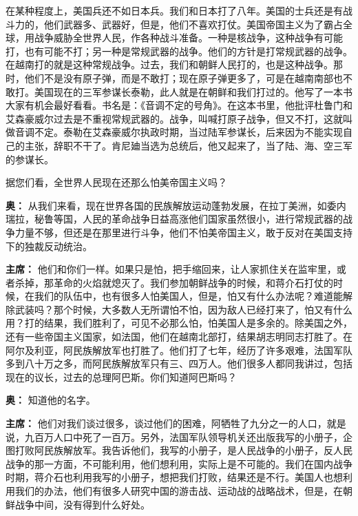\begin{duihua}
在某种程度上，美国兵还不如日本兵。我们和日本打了八年。美国的士兵还是有战斗力的，他们武器多、武器好，但是，他们不喜欢打仗。美国帝国主义为了霸占全球，用战争威胁全世界人民，作各种战斗准备。一种是核战争，这种战争有可能打，也有可能不打；另一种是常规武器的战争。他们的方针是打常规武器的战争。在越南打的就是这种常规战争。过去，我们和朝鲜人民打的，也是这种战争。那时，他们不是没有原子弹，而是不敢打；现在原子弹更多了，可是在越南南部也不敢打。美国现在的三军参谋长泰勒，此人就是在朝鲜和我们打过的。他写了一本书大家有机会最好看看。书名是：《音调不定的号角》。在这本书里，他批评杜鲁门和艾森豪威尔过去是不重视常规武器的。战争，叫喊打原子战争，但又不打，这就叫做音调不定。泰勒在艾森豪威尔执政时期，当过陆军参谋长，后来因为不能实现自己的主张，辞职不干了。肯尼廸当选为总统后，他又起来了，当了陆、海、空三军的参谋长。

据您们看，全世界人民现在还那么怕美帝国主义吗？

\item[\textbf{奥：}] 从我们来看，现在世界各国的民族解放运动蓬勃发展，在拉丁美洲，如委内瑞拉，秘鲁等国，人民的革命战争日益高涨他们国家虽然很小，进行常规武器的战争力量不够，但还是在那里进行斗争，他们不怕美帝国主义，敢于反对在美国支持下的独裁反动统治。

\item[\textbf{主席：}] 他们和你们一样。如果只是怕，把手缩回来，让人家抓住关在监牢里，或者杀掉，那革命的火焰就熄灭了。我们参加朝鲜战争的时候，和蒋介石打仗的时候，在我们的队伍中，也有很多人怕美国人，但是，怕又有什么办法呢？难道能解除武装吗？那个时候，大多数人无所谓怕不怕，因为敌人已经打来了，怕又有什么用？打的结果，我们胜利了，可见不必那么怕，怕美国人是多余的。除美国之外，还有一些帝国主义国家，如法国，他们在越南北部打，结果胡志明同志打胜了。在阿尔及利亚，阿民族解放军也打胜了。他们打了七年，经历了许多艰难，法国军队多到八十万之多，而阿民族解放军只有三、四万人。他们很多人都同我讲过，包括现在的议长，过去的总理阿巴斯。你们知道阿巴斯吗？

\item[\textbf{奥：}] 知道他的名字。

\item[\textbf{主席：}] 他们对我们谈过很多，谈过他们的困难，阿牺牲了九分之一的人口，就是说，九百万人口中死了一百万。另外，法国军队领导机关还出版我写的小册子，企图打败阿民族解放军。我告诉他们，我写的小册子，是人民战争的小册子，反人民战争的那一方面，不可能利用，他们想利用，实际上是不可能的。我们在国内战争时期，蒋介石也利用我写的小册子，想把我们打败，结果还是不行。美国人也想利用我们的办法，他们有很多人研究中国的游击战、运动战的战略战术，但是，在朝鲜战争中间，没有得到什么好处。


\end{duihua}
